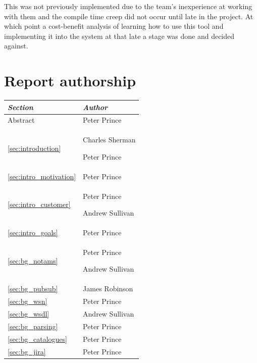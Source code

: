 \documentclass[a4paper, 12pt, twoside]{article}
\newcommand*{\fullref}[1]{\ref{#1} \nameref{#1}}
\begin{document}
This was not previously implemented due to the team's inexperience at working with them and the compile time creep did not occur until late in the project. At which point a cost-benefit analysis of learning how to use this tool and implementing it into the system at that late a stage was done and decided against.

\newpage

\sloppy
\printbibliography

\appendix

\section{Report authorship}

\begin{tabularx}{\textwidth}{|X|X|} \hline
  \emph{Section}                         & \emph{Author}                      \\ \hline
  Abstract                               & Peter Prince                       \\ \hline
  \fullref{sec:introduction}             & Charles Sherman\par Peter Prince   \\ \hline
  \fullref{sec:intro_motivation}         & Peter Prince                       \\
  \fullref{sec:intro_customer}           & Peter Prince\par Andrew Sullivan   \\
  \fullref{sec:intro_goals}              & Peter Prince                       \\ \hline
  \fullref{sec:bg_notams}                & Peter Prince\par Andrew Sullivan   \\
  \fullref{sec:bg_pubsub}                & James Robinson                     \\
  \fullref{sec:bg_wsn}                   & Peter Prince                       \\
  \fullref{sec:bg_wsdl}                  & Andrew Sullivan                    \\
  \fullref{sec:bg_parsing}               & Peter Prince                       \\
  \fullref{sec:bg_catalogues}            & Peter Prince                       \\
  \fullref{sec:bg_jira}                  & Peter Prince                       \\

\end{tabularx}
\end{document}
